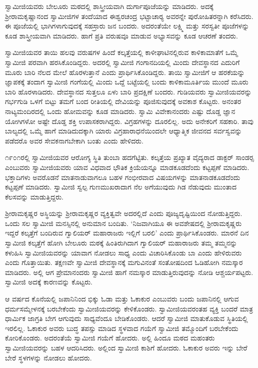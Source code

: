  ಸ್ವಾಮೀಜಿಯವರು ಬೇಲೂರು ಮಠದಲ್ಲಿ ಶಾಸ್ತ್ರೀಯವಾಗಿ ದುರ್ಗಾಪೂಜೆಯನ್ನು ಮಾಡಿದರು. ಅದಕ್ಕೆ ಶ‍್ರೀರಾಮಕೃಷ್ಣಾನಂದ ಸ್ವಾಮೀಜಿಗಳ ತಂದೆಯಾದ ಈಶ್ವರಚಂದ್ರ ಭಟ್ಟಾಚಾರ‍್ಯ ಅವರನ್ನೇ ಪುರೋಹಿತರನ್ನಾಗಿ ಕರೆಸಿದರು. ಈ ಪೂಜೆಯಲ್ಲಿ ಭಾಗಿಗಳಾಗುವುದಕ್ಕೆ ಸಹಸ್ರಾರು ಜನ ಬಂದರು. ಅದರಂತೆಯೇ ಲಕ್ಷ್ಮಿ ಮತ್ತು ಸರಸ್ವತೀ ಪೂಜೆಗಳನ್ನು ಕೂಡ ಶಾಸ್ತ್ರೀಯವಾಗಿ ಮಾಡಿದರು. ಹಾಗೆ ಪ್ರತಿ ವರುಷವೂ ಮಾಡುವ ಅಭ್ಯಾಸವನ್ನು ಕೂಡ ಆಚರಣೆ ತಂದರು. 

 ಸ್ವಾಮೀಜಿಯವರ ತಾಯಿ ಹಲವು ವರುಷಗಳ ಹಿಂದೆ ಕಲ್ಕತ್ತೆಯಲ್ಲಿ ಕಾಳೀಘಾಟಿನಲ್ಲಿರುವ ಕಾಳಿಕಾಮಾತೆಗೆ ಒಮ್ಮೆ ಸ್ವಾಮೀಜಿ ಪರವಾಗಿ ಹರಸಿಕೊಂಡಿದ್ದರು. ಅದರಲ್ಲಿ ಸ್ವಾಮೀಜಿ ಗಂಗಾನದಿಯಲ್ಲಿ ಮಿಂದು ದೇವಸ್ಥಾನದ ಎದುರಿಗೆ ಮೂರು ಬಾರಿ ನೆಲದ ಮೇಲೆ ಹೊರಳುತ್ತಾನೆ ಎಂದು ಪ್ರಾರ್ಥಿಸಿಕೊಂಡಿದ್ದರು. ತಾಯಿ ಸ್ವಾಮೀಜಿಗೆ ಆ ಹರಕೆಯನ್ನು ಜ್ಞಾಪಕಕ್ಕೆ ತಂದಾಗ ಸ್ವಾಮೀಜಿ ಗಂಗೆಯಲ್ಲಿ ಮಿಂದು ಒದ್ದೆ ಬಟ್ಟೆಯಲ್ಲಿ ಬಂದು ಕಾಳಿಕಾಮೂರ್ತಿಯ ಮುಂದೆ ಮೂರು ಬಾರಿ ಹೊರಳಾಡಿದರು. ದೇವಸ್ಥಾನದ ಸುತ್ತಲೂ ಏಳು ಬಾರಿ ಪ್ರದಕ್ಷಿಣೆ ಬಂದರು. ಗುಡಿಯವರು ಸ್ವಾಮೀಜಿಯವರನ್ನು ಗರ್ಭಗುಡಿ ಒಳಗೆ ಬಿಟ್ಟು ತಮಗೆ ಬಂದ ರೀತಿಯಲ್ಲಿ ದೇವಿಯನ್ನು ಪೂಜಿಸುವುದಕ್ಕೆ ಅವಕಾಶ ಕೊಟ್ಟರು. ಅನಂತರ ನಾಟ್ಯಮಂದಿರದಲ್ಲಿ ಒಂದು ಹೋಮವನ್ನು ಕೂಡ ಮಾಡಿದರು. ಸ್ವಾಮಿ ವಿವೇಕಾನಂದರು ಎಷ್ಟು ದೊಡ್ಡ ಜ್ಞಾನ ಯೋಗಿಗಳೋ ಅಷ್ಟೇ ದೊಡ್ಡ ಶಕ್ತಿ ಉಪಾಸಕರಾಗಿದ್ದರು. ವಿಗ್ರಹಗಳನ್ನು ದೂರಲಿಲ್ಲ. ಅದು ಅನೇಕರಿಗೆ ಸಹಕಾರಿ. ತಾವು ಬಾಲ್ಯದಲ್ಲಿ ಒಮ್ಮೆ ಹಾಗೆ ಮಾಡಿದುದಕ್ಕಾಗಿ ಯಾರು ವಿಗ್ರಹಾರಾಧನೆಯಿಂದಲೇ ಆಧ್ಯಾತ್ಮಿಕ ಜೀವನದ ಸರ್ವಸ್ವವನ್ನು ಪಡೆದರೊ ಅವರ ಸೇವಕನಾಗಬೇಕಾಗಿ ಬಂತು ಎಂದು ಹೇಳಿದರು. 

\newpage

 ೧೯೦೧ರಲ್ಲಿ ಸ್ವಾಮೀಜಿಯವರ ಆರೋಗ್ಯ ಸ್ಥಿತಿ ತುಂಬಾ ಹದಗೆಟ್ಟಿತು. ಕಲ್ಕತ್ತೆಯ ಪ್ರಖ್ಯಾತ ವೈದ್ಯರಾದ ಡಾಕ್ಟರ್ ಸಾಂಡರ‍್ಸ ಎಂಬುವರು ಸ್ವಾಮೀಜಿಯವರು ಯಾವ ವಿಧವಾದ ಭೌತಿಕ ಕ್ರಿಯೆಯನ್ನೂ ಮಾಡಕೂಡದೆಂದು ಕಟ್ಟಪ್ಪಣೆ ಮಾಡಿದರು. ಭಕ್ತಾದಿಗಳು ಅವರೊಡನೆ ಮಾತನಾಡುವಾಗಲೂ ಬಹಳ ಗಂಭೀರವಾದ ವಿಷಯಗಳನ್ನು ಮಾತನಾಡಕೂಡದೆಂದು ಕಟ್ಟಪ್ಪಣೆ ಮಾಡಿದರು. ಸ್ವಾಮೀಜಿ ಸ್ವಲ್ಪ ಗುಣಮುಖರಾದಾಗ ನೆಲ ಅಗೆಯುವುದು ಗಿಡ ನೆಡುವುದು ಮುಂತಾದ ಕೆಲಸವನ್ನು ಮಾಡುತ್ತಿದ್ದರು. 

 ಶ‍್ರೀರಾಮಕೃಷ್ಣರ ಅಸ್ಥಿಯನ್ನು ಶ‍್ರೀರಾಮಕೃಷ್ಣರ ವ್ಯಕ್ತಿತ್ವವೇ ಅದರಲ್ಲಿದೆ ಎಂದು ಪೂಜ್ಯದೃಷ್ಟಿಯಿಂದ ನೋಡುತ್ತಿದ್ದರು. ಒಂದು ಸಲ ಸ್ವಾಮೀಜಿ ಮನಸ್ಸಿನಲ್ಲಿ ಅನುಮಾನ ಬಂದಿತು. ‘ನಿಜವಾಗಿಯೂ ಈ ಅವಶೇಷದಲ್ಲಿ ಶ‍್ರೀರಾಮಕೃಷ್ಣರು ಇದ್ದರೆ ಕಲ್ಕತ್ತೆಗೆ ಬಂದಿರುವ ಗ್ವಾಲಿಯರ್ ಮಹಾರಾಜರು ಇಲ್ಲಿಗೆ ಬರಲಿ’ ಎಂದು ಪ್ರಾರ್ಥಿಸಿಕೊಂಡರು. ಮಾರನೆ ದಿನ ಸ್ವಾಮೀಜಿ ಕಲ್ಕತ್ತೆಗೆ ಹೋಗಿ ಬೇಲೂರು ಮಠಕ್ಕೆ ಹಿಂತಿರುಗಿದಾಗ ಗ್ವಾಲಿಯರ್ ಮಹಾರಾಜರು ತಮ್ಮ ತಮ್ಮನನ್ನು ಕಳುಹಿಸಿ ಸ್ವಾಮೀಜಿಯವರನ್ನು ಯಾವಾಗ ನೋಡಲು ಸಾಧ್ಯ ಎಂದು ವಿಚಾರಿಸಿಕೊಂಡು ಬಾ ಎಂದು ಹೇಳಿರುವರು ಎಂದು ಗೊತ್ತಾಯಿತು. ತಕ್ಷಣವೇ ಸ್ವಾಮೀಜಿ ದೇವಸ್ಥಾನಕ್ಕೆ ಮಗುವಿನಂತೆ ಸಂತೋಷದಿಂದ ಓಡಿಹೋಗಿ ನಮಸ್ಕಾರ ಮಾಡಿದರು. ಅಲ್ಲಿ ಆಗ ಪ್ರೇಮಾನಂದರು ಸ್ವಾಮೀಜಿ ಹಾಗೆ ನಮಸ್ಕಾರ ಮಾಡುತ್ತಿರುವುದನ್ನು ನೋಡಿ ಆಶ್ಚರ್ಯಪಟ್ಟರು. ಸ್ವಾಮೀಜಿ ಅದಕ್ಕೆ ಕಾರಣವನ್ನು ಕೊಟ್ಟರು. 

 ಆ ವರ್ಷದ ಕೊನೆಯಲ್ಲಿ ಜಪಾನಿನಿಂದ ಭಿಕ್ಕು ಓಡಾ ಮತ್ತು ಓಕಾಕುರ ಎಂಬುವರು ಬಂದು ಜಪಾನಿನಲ್ಲಿ ಆಗುವ ಧರ್ಮಸಮ್ಮೇಳನಕ್ಕೆ ಬರಬೇಕೆಂದು ಸ್ವಾಮೀಜಿಯವರನ್ನು ಕೇಳಿಕೊಂಡರು. ಸ್ವಾಮೀಜಿಯವರಂತಹ ವ್ಯಕ್ತಿ ಬಂದರೆ ಮಾತ್ರ ಧಾರ್ಮಿಕ ಜಾಗ್ರತಿ ಬೇಗ ಆಗುವುದು ಸಾಧ್ಯವೆಂದೂ ಬೇಡಿಕೊಂಡರು. ಆದರೆ ಸ್ವಾಮೀಜಿ ಮಾತುಕೊಡುವ ಸ್ಥಿತಿಯಲ್ಲಿ ಇರಲಿಲ್ಲ. ಓಕಾಕುರ ಅವರು ಬುದ್ಧ ತಪಸ್ಸು ಮಾಡಿದ ಸ್ಥಳವಾದ ಗಯೆಗೆ ಸ್ವಾಮೀಜಿ ತಮ್ಮೊಂದಿಗೆ ಬರಬೇಕೆಂದು ಕೋರಿಕೊಂಡರು. ಅದರಂತೆಯೆ ಸ್ವಾಮೀಜಿ ಗಯೆಗೆ ಹೋದರು. ಅಲ್ಲಿ ಹಿಂದೂ ಮಠದ ಮಹಂತರು ಸ್ವಾಮೀಜಿಯವರನ್ನು ಬಹಳ ಆದರಿಸಿದರು. ಅಲ್ಲಿಂದ ಸ್ವಾಮೀಜಿ ಕಾಶಿಗೆ ಹೋದರು. ಓಕಾಕುರ ಅವರು ಇನ್ನು ಬೇರೆ ಬೇರೆ ಸ್ಥಳಗಳನ್ನು ನೋಡಲು ಹೋದರು. 

